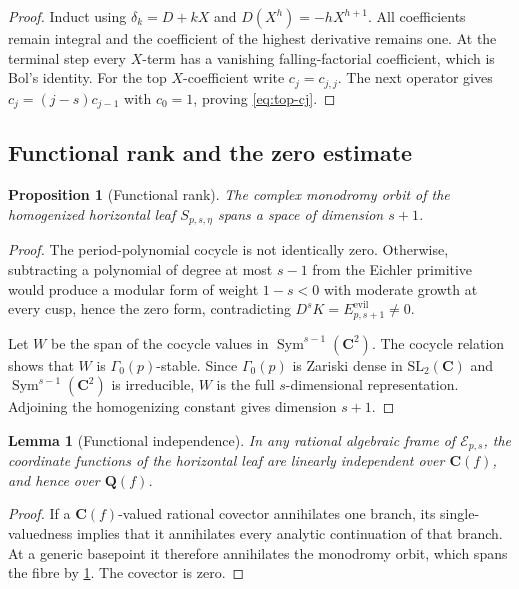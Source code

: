 \documentclass[11pt]{article}
\newtheorem{proposition}[proposition]{Proposition}
\newtheorem{lemma}[lemma]{Lemma}
\theoremstyle{definition}
\theoremstyle{remark}
\newcommand{\Q}{\mathbf Q}
\newcommand{\C}{\mathbf C}
\newcommand{\Sym}{\operatorname{Sym}}
\newcommand{\calE}{\mathcal E}
\begin{document}
\begin{proof}
Induct using $\delta_k=D+kX$ and $D(X^h)=-hX^{h+1}$.  All coefficients
remain integral and the coefficient of the highest derivative remains one.
At the terminal step every $X$-term has a vanishing falling-factorial
coefficient, which is Bol's identity.  For the top $X$-coefficient write
$c_j=c_{j,j}$.  The next operator gives
$c_j=(j-s)c_{j-1}$ with $c_0=1$, proving \eqref{eq:top-cj}.
\end{proof}

\subsection{Functional rank and the zero estimate}

\begin{proposition}[Functional rank]\label{prop:functional-rank}
The complex monodromy orbit of the homogenized horizontal leaf
$S_{p,s,\eta}$ spans a space of dimension $s+1$.
\end{proposition}

\begin{proof}
The period-polynomial cocycle is not identically zero.  Otherwise, subtracting a polynomial
of degree at most $s-1$ from the Eichler primitive would produce a modular
form of weight $1-s<0$ with moderate growth at every cusp, hence the zero
form, contradicting $D^sK=E_{p,s+1}^{\mathrm{evil}}\ne0$.

Let $W$ be the span of the cocycle values in
$\Sym^{s-1}(\C^2)$.  The cocycle relation shows that $W$ is
$\Gamma_0(p)$-stable.  Since $\Gamma_0(p)$ is Zariski dense in
$\mathrm{SL}_2(\C)$ and $\Sym^{s-1}(\C^2)$ is irreducible, $W$ is the
full $s$-dimensional representation.  Adjoining the homogenizing constant
gives dimension $s+1$.
\end{proof}

\begin{lemma}[Functional independence]\label{lem:functional-independence}
In any rational algebraic frame of $\calE_{p,s}$, the coordinate functions of
the horizontal leaf are linearly independent over $\C(f)$, and hence over
$\Q(f)$.
\end{lemma}

\begin{proof}
If a $\C(f)$-valued rational covector annihilates one branch, its
single-valuedness implies that it annihilates every analytic continuation of
that branch.  At a generic basepoint it therefore annihilates the monodromy
orbit, which spans the fibre by \cref{prop:functional-rank}.  The covector is
zero.
\end{proof}
\end{document}
